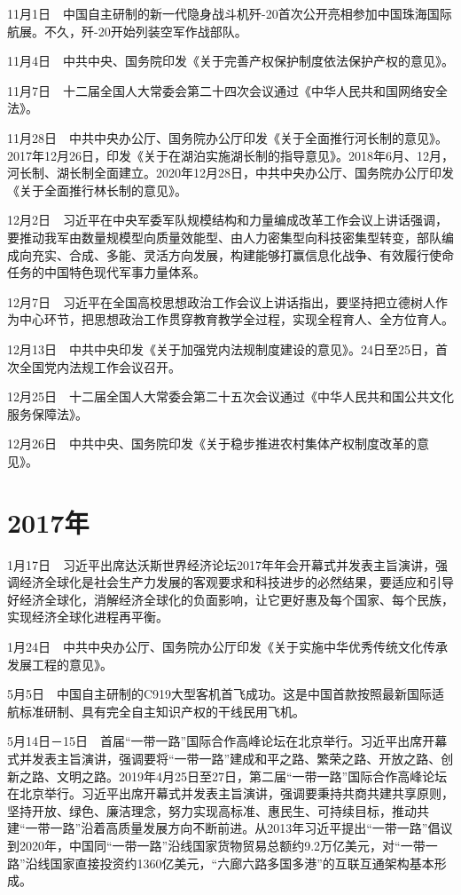 \documentclass[10pt,a4paper,twocolumn]{book}
\begin{document}
11月1日　中国自主研制的新一代隐身战斗机歼-20首次公开亮相参加中国珠海国际航展。不久，歼-20开始列装空军作战部队。

11月4日　中共中央、国务院印发《关于完善产权保护制度依法保护产权的意见》。

11月7日　十二届全国人大常委会第二十四次会议通过《中华人民共和国网络安全法》。

11月28日　中共中央办公厅、国务院办公厅印发《关于全面推行河长制的意见》。2017年12月26日，印发《关于在湖泊实施湖长制的指导意见》。2018年6月、12月，河长制、湖长制全面建立。2020年12月28日，中共中央办公厅、国务院办公厅印发《关于全面推行林长制的意见》。

12月2日　习近平在中央军委军队规模结构和力量编成改革工作会议上讲话强调，要推动我军由数量规模型向质量效能型、由人力密集型向科技密集型转变，部队编成向充实、合成、多能、灵活方向发展，构建能够打赢信息化战争、有效履行使命任务的中国特色现代军事力量体系。

12月7日　习近平在全国高校思想政治工作会议上讲话指出，要坚持把立德树人作为中心环节，把思想政治工作贯穿教育教学全过程，实现全程育人、全方位育人。

12月13日　中共中央印发《关于加强党内法规制度建设的意见》。24日至25日，首次全国党内法规工作会议召开。

12月25日　十二届全国人大常委会第二十五次会议通过《中华人民共和国公共文化服务保障法》。

12月26日　中共中央、国务院印发《关于稳步推进农村集体产权制度改革的意见》。

\section{2017年}

1月17日　习近平出席达沃斯世界经济论坛2017年年会开幕式并发表主旨演讲，强调经济全球化是社会生产力发展的客观要求和科技进步的必然结果，要适应和引导好经济全球化，消解经济全球化的负面影响，让它更好惠及每个国家、每个民族，实现经济全球化进程再平衡。

1月24日　中共中央办公厅、国务院办公厅印发《关于实施中华优秀传统文化传承发展工程的意见》。

5月5日　中国自主研制的C919大型客机首飞成功。这是中国首款按照最新国际适航标准研制、具有完全自主知识产权的干线民用飞机。

5月14日－15日　首届“一带一路”国际合作高峰论坛在北京举行。习近平出席开幕式并发表主旨演讲，强调要将“一带一路”建成和平之路、繁荣之路、开放之路、创新之路、文明之路。2019年4月25日至27日，第二届“一带一路”国际合作高峰论坛在北京举行。习近平出席开幕式并发表主旨演讲，强调要秉持共商共建共享原则，坚持开放、绿色、廉洁理念，努力实现高标准、惠民生、可持续目标，推动共建“一带一路”沿着高质量发展方向不断前进。从2013年习近平提出“一带一路”倡议到2020年，中国同“一带一路”沿线国家货物贸易总额约9.2万亿美元，对“一带一路”沿线国家直接投资约1360亿美元，“六廊六路多国多港”的互联互通架构基本形成。
\end{document}
